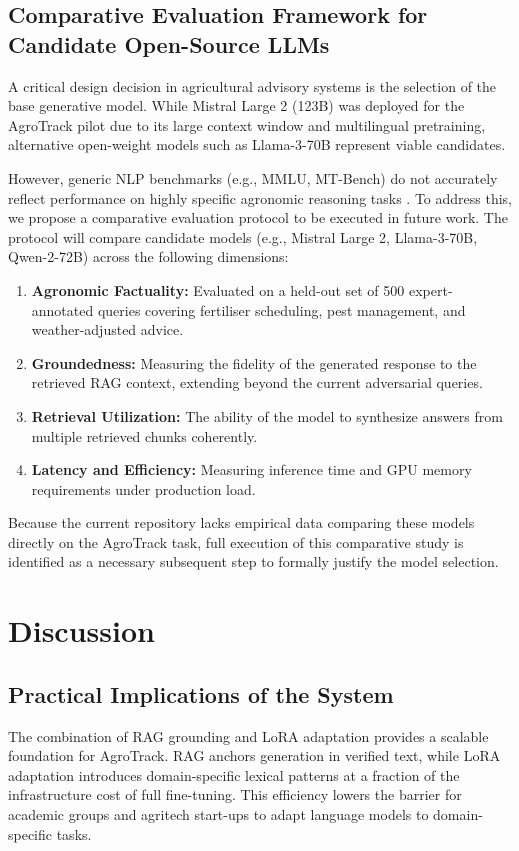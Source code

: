 \documentclass[10pt,twocolumn,letterpaper]{article}
\begin{document}
\subsection{Comparative Evaluation Framework for Candidate Open-Source LLMs}
A critical design decision in agricultural advisory systems is the selection of the base generative model. While Mistral Large 2 (123B) was deployed for the AgroTrack pilot due to its large context window and multilingual pretraining, alternative open-weight models such as Llama-3-70B represent viable candidates.

However, generic NLP benchmarks (e.g., MMLU, MT-Bench) do not accurately reflect performance on highly specific agronomic reasoning tasks \cite{Mistral_2024}. To address this, we propose a comparative evaluation protocol to be executed in future work. The protocol will compare candidate models (e.g., Mistral Large 2, Llama-3-70B, Qwen-2-72B) across the following dimensions:
\begin{enumerate}
    \item \textbf{Agronomic Factuality:} Evaluated on a held-out set of 500 expert-annotated queries covering fertiliser scheduling, pest management, and weather-adjusted advice.
    \item \textbf{Groundedness:} Measuring the fidelity of the generated response to the retrieved RAG context, extending beyond the current adversarial queries.
    \item \textbf{Retrieval Utilization:} The ability of the model to synthesize answers from multiple retrieved chunks coherently.
    \item \textbf{Latency and Efficiency:} Measuring inference time and GPU memory requirements under production load.
\end{enumerate}
Because the current repository lacks empirical data comparing these models directly on the AgroTrack task, full execution of this comparative study is identified as a necessary subsequent step to formally justify the model selection.

\section{Discussion}
\subsection{Practical Implications of the System}
The combination of RAG grounding and LoRA adaptation provides a scalable foundation for AgroTrack. RAG anchors generation in verified text, while LoRA adaptation introduces domain-specific lexical patterns at a fraction of the infrastructure cost of full fine-tuning. This efficiency lowers the barrier for academic groups and agritech start-ups to adapt language models to domain-specific tasks.
\end{document}
